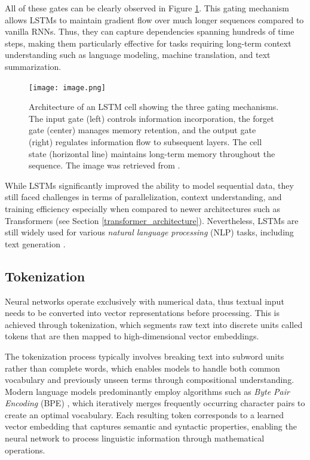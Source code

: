 All of these gates can be clearly observed in Figure \ref{fig:lstm-architecture}. This gating mechanism allows LSTMs to maintain gradient flow over much longer sequences compared to vanilla RNNs. Thus, they can capture dependencies spanning hundreds of time steps, making them particularly effective for tasks requiring long-term context understanding such as language modeling, machine translation, and text summarization.
\begin{figure}[!htbp]
\centering
\texttt{[image: image.png]}
\caption[LSTM Cell Architecture]{Architecture of an LSTM cell showing the three gating mechanisms. The input gate (left) controls information incorporation, the forget gate (center) manages memory retention, and the output gate (right) regulates information flow to subsequent layers. The cell state (horizontal line) maintains long-term memory throughout the sequence. The image was retrieved from \cite{hinton-lstm}.}
\label{fig:lstm-architecture}
\end{figure}

While LSTMs significantly improved the ability to model sequential data, they still faced challenges in terms of parallelization, context understanding, and training efficiency especially when compared to newer architectures such as Transformers \cite{attention_is_all_you_need} (see Section \ref{transformer_architecture}).  Nevertheless, LSTMs are still widely used for various \textit{natural language processing} (NLP) tasks, including text generation \cite{lstm_textgeneration}.

\subsection{Tokenization}

Neural networks operate exclusively with numerical data, thus textual input needs to be converted into vector representations before processing. This is achieved through tokenization, which segments raw text into discrete units called tokens that are then mapped to high-dimensional vector embeddings.

The tokenization process typically involves breaking text into subword units rather than complete words, which enables models to handle both common vocabulary and previously unseen terms through compositional understanding. Modern language models predominantly employ algorithms such as \textit{Byte Pair Encoding} (BPE) \cite{bpe}, which iteratively merges frequently occurring character pairs to create an optimal vocabulary. Each resulting token corresponds to a learned vector embedding that captures semantic and syntactic properties, enabling the neural network to process linguistic information through mathematical operations.

